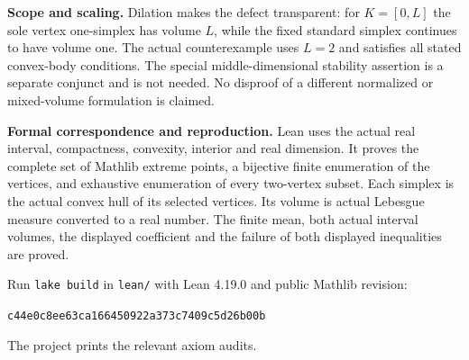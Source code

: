 \documentclass[11pt,a4paper]{article}
\begin{document}
\textbf{Scope and scaling.}
Dilation makes the defect transparent: for $K=[0,L]$ the sole
vertex one-simplex has volume $L$, while the fixed standard
simplex continues to have volume one.
The actual counterexample uses $L=2$ and satisfies all stated
convex-body conditions.
The special middle-dimensional stability assertion is a
separate conjunct and is not needed.
No disproof of a different normalized or mixed-volume
formulation is claimed.

\textbf{Formal correspondence and reproduction.}
Lean uses the actual real interval, compactness, convexity,
interior and real dimension. It proves the complete set of
Mathlib extreme points, a bijective finite enumeration of the
vertices, and exhaustive enumeration of every two-vertex subset.
Each simplex is the actual convex hull of its selected vertices.
Its volume is actual Lebesgue measure converted to a real number.
The finite mean, both actual interval volumes, the displayed
coefficient and the failure of both displayed inequalities are
proved.

Run \texttt{lake build} in \texttt{lean/} with Lean 4.19.0 and
public Mathlib revision:
\begin{center}\small
\texttt{c44e0c8ee63ca166450922a373c7409c5d26b00b}
\end{center}
The project prints the relevant axiom audits.
\end{document}
